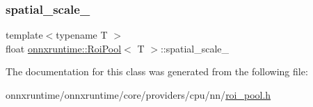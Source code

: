 \subsubsection{\texorpdfstring{spatial\+\_\+scale\+\_\+}{spatial\_scale\_}}
{\footnotesize\ttfamily template$<$typename T $>$ \\
float \mbox{\hyperlink{classonnxruntime_1_1RoiPool}{onnxruntime\+::\+Roi\+Pool}}$<$ T $>$\+::spatial\+\_\+scale\+\_\+\hspace{0.3cm}{\ttfamily [protected]}}



The documentation for this class was generated from the following file\+:\begin{DoxyCompactItemize}
\item 
onnxruntime/onnxruntime/core/providers/cpu/nn/\mbox{\hyperlink{roi__pool_8h}{roi\+\_\+pool.\+h}}\end{DoxyCompactItemize}
